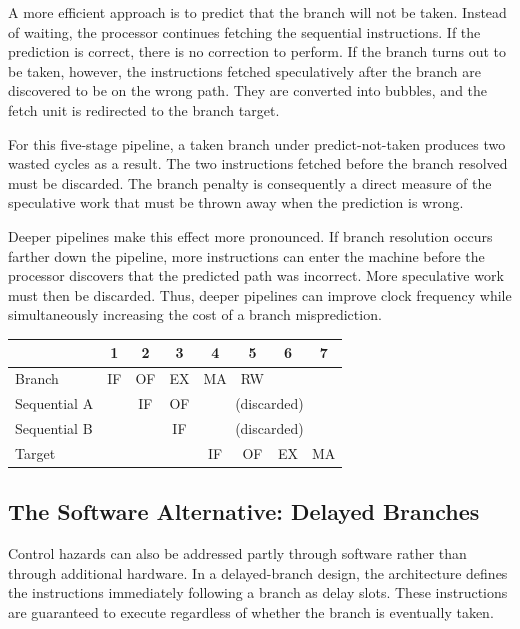 \documentclass[12pt,a4paper]{report}
\begin{document}
A more efficient approach is to predict that the branch will not be taken. Instead of waiting, the processor continues fetching the sequential instructions. If the prediction is correct, there is no correction to perform. If the branch turns out to be taken, however, the instructions fetched speculatively after the branch are discovered to be on the wrong path. They are converted into bubbles, and the fetch unit is redirected to the branch target.

For this five-stage pipeline, a taken branch under predict-not-taken produces two wasted cycles as a result. The two instructions fetched before the branch resolved must be discarded. The branch penalty is consequently a direct measure of the speculative work that must be thrown away when the prediction is wrong.~\cite{sarangi}

Deeper pipelines make this effect more pronounced. If branch resolution occurs farther down the pipeline, more instructions can enter the machine before the processor discovers that the predicted path was incorrect. More speculative work must then be discarded. Thus, deeper pipelines can improve clock frequency while simultaneously increasing the cost of a branch misprediction.

\begin{center}
\begin{tabular}{lccccccc}
\toprule
& 1 & 2 & 3 & 4 & 5 & 6 & 7 \\
\midrule
Branch & IF & OF & EX & MA & RW & & \\
Sequential A & & IF & OF & \multicolumn{4}{c}{(discarded)} \\
Sequential B & & & IF & \multicolumn{4}{c}{(discarded)} \\
Target & & & & IF & OF & EX & MA \\
\bottomrule
\end{tabular}
\end{center}

\subsection{The Software Alternative: Delayed Branches}

Control hazards can also be addressed partly through software rather than through additional hardware. In a delayed-branch design, the architecture defines the instructions immediately following a branch as delay slots. These instructions are guaranteed to execute regardless of whether the branch is eventually taken.
\end{document}
